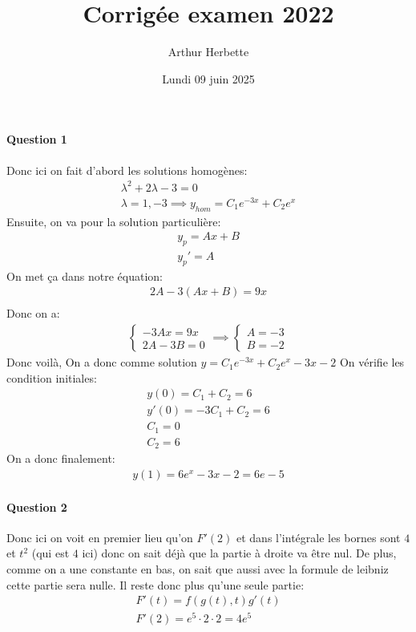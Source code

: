 \documentclass[a4paper]{article}
\title{Corrigée examen 2022}
\author{Arthur Herbette }
\date{Lundi 09 juin 2025}
\begin{document}
\maketitle

\paragraph{Question 1}
Donc ici on fait d'abord les solutions homogènes:
\begin{align*} 
	\lambda^2 + 2\lambda - 3 = 0\\
	\lambda = 1, -3 \implies y_{hom} = C_1e^{-3x} + C_2e^{x}
\end{align*}
Ensuite, on va pour la solution particulière:
\begin{align*} 
	y_{p} = Ax + B\\
	y_p' = A
\end{align*}
On met ça dans notre équation:
\begin{align*} 
	2A - 3\left(Ax + B\right) = 9x\\
\end{align*}
Donc on a:
\begin{align*} 
	\begin{cases}
	    -3Ax = 9x\\
	    2A - 3B = 0
	\end{cases} \implies 
	\begin{cases}
	    A = -3\\
	    B = -2
	\end{cases}
\end{align*}
Donc voilà, On a donc comme solution $y = C_1e^{-3x} + C_2e^{x} -3x -2$
On vérifie les condition initiales:
\begin{align*} 
	y\left(0\right) = C_1 + C_2 = 6\\
        y'\left(0\right) = -3C_1 + C_2 = 6\\
	C_1 = 0\\
	C_2 = 6
\end{align*}
On a donc finalement:
\begin{align*} 
	y\left(1\right) = 6e^{x} -3x -2 = 6e -5
\end{align*}
\paragraph{Question 2}
Donc ici on voit en premier lieu qu'on $F'\left(2\right)$ et dans l'intégrale les bornes sont $4$ et $t^2$ (qui est $4$  ici) donc on sait déjà que la partie à droite va être nul. De plus, comme on a une constante en bas, on sait que aussi avec la formule de leibniz cette partie sera nulle. Il reste donc plus qu'une seule partie:
\begin{align*} 
	F'\left(t\right) = f\left(g\left(t\right), t\right)g'\left(t\right)\\
	F'\left(2\right) = e^5 \cdot 2\cdot 2 = 4e^5
\end{align*}
\end{document}
